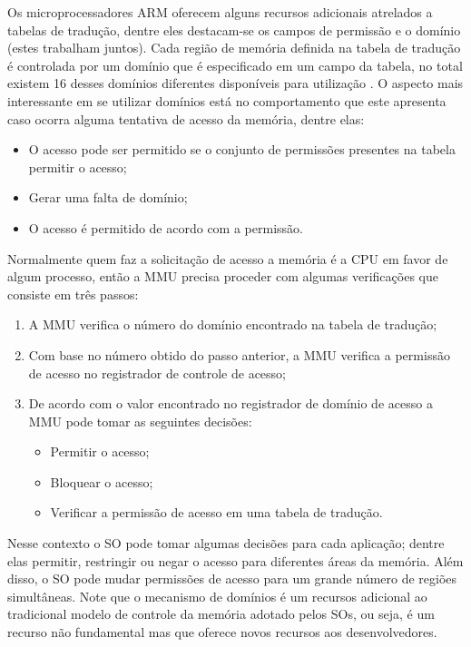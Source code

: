 Os microprocessadores ARM oferecem alguns recursos adicionais atrelados a
tabelas de tradução, dentre eles destacam-se os campos de permissão e o domínio
(estes trabalham juntos). Cada região de memória definida na tabela de tradução
é controlada por um domínio que é especificado em um campo da tabela, no total
existem 16 desses domínios diferentes disponíveis para utilização
\cite{armdeveloperguide}. O aspecto mais interessante em se utilizar domínios
está no comportamento que este apresenta caso ocorra alguma tentativa de acesso
da memória, dentre elas:

\begin{itemize}
  \item O acesso pode ser permitido se o conjunto de permissões presentes na
        tabela permitir o acesso;
  \item Gerar uma falta de domínio;
  \item O acesso é permitido de acordo com a permissão.
\end{itemize}

Normalmente quem faz a solicitação de acesso a memória é a CPU em favor de
algum processo, então a MMU precisa proceder com algumas verificações que
consiste em três passos:

\begin{enumerate}
  \item A MMU verifica o número do domínio encontrado na tabela de tradução;
  \item Com base no número obtido do passo anterior, a MMU verifica a permissão
        de acesso no registrador de controle de acesso;
  \item De acordo com o valor encontrado no registrador de domínio de acesso a
        MMU pode tomar as seguintes decisões:
  \begin{itemize}
    \item Permitir o acesso;
    \item Bloquear o acesso;
    \item Verificar a permissão de acesso em uma tabela de tradução.
  \end{itemize}
\end{enumerate}

Nesse contexto o SO pode tomar algumas decisões para cada aplicação; dentre
elas permitir, restringir ou negar o acesso para diferentes áreas da memória.
Além disso, o SO pode mudar permissões de acesso para um grande número de
regiões simultâneas. Note que o mecanismo de domínios é um recursos adicional
ao tradicional modelo de controle da memória adotado pelos SOs, ou seja, é
um recurso não fundamental mas que oferece novos recursos aos desenvolvedores.

